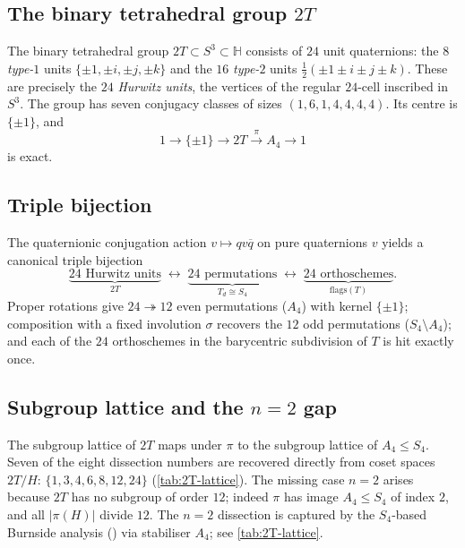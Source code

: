 \documentclass[11pt,a4paper]{article}
\theoremstyle{plain}
\theoremstyle{definition}
\theoremstyle{remark}
\newcommand{\Td}{T_{\!d}}
\newcommand{\HH}{\mathbb{H}}
\begin{document}
\subsection{The binary tetrahedral group \texorpdfstring{$2T$}{2T}}

The binary tetrahedral group $2T \subset S^{3} \subset \HH$ consists of $24$
unit quaternions: the $8$ \emph{type-$1$} units $\{\pm 1, \pm i, \pm j, \pm k\}$
and the $16$ \emph{type-$2$} units $\tfrac{1}{2}(\pm 1 \pm i \pm j \pm k)$.
These are precisely the $24$ \emph{Hurwitz units}, the vertices of the
regular $24$-cell inscribed in $S^{3}$.  The group has seven conjugacy
classes of sizes $(1,6,1,4,4,4,4)$.  Its centre is $\{\pm 1\}$, and
\begin{equation}\label{eq:2T-ses}
  1 \longrightarrow \{\pm 1\} \longrightarrow 2T \xrightarrow{\;\pi\;}
  A_{4} \longrightarrow 1
\end{equation}
is exact.

\subsection{Triple bijection}

The quaternionic conjugation action $v \mapsto q v \overline{q}$ on pure
quaternions $v$ yields a canonical triple bijection
\begin{equation}\label{eq:triple-bij}
  \underbrace{24 \text{ Hurwitz units}}_{2T}
  \;\longleftrightarrow\;
  \underbrace{24 \text{ permutations}}_{\Td \cong S_{4}}
  \;\longleftrightarrow\;
  \underbrace{24 \text{ orthoschemes}}_{\text{flags}(T)}.
\end{equation}
Proper rotations give $24 \twoheadrightarrow 12$ even permutations ($A_{4}$)
with kernel $\{\pm 1\}$; composition with a fixed involution $\sigma$
recovers the $12$ odd permutations ($S_{4} \setminus A_{4}$); and each of the
$24$ orthoschemes in the barycentric subdivision of $T$ is hit exactly once.

\subsection{Subgroup lattice and the \texorpdfstring{$n = 2$}{n = 2} gap}

The subgroup lattice of $2T$ maps under $\pi$ to the subgroup lattice of
$A_{4} \leq S_{4}$.  Seven of the eight dissection numbers are recovered
directly from coset spaces $2T/H$: $\{1,3,4,6,8,12,24\}$
(\cref{tab:2T-lattice}).  The missing case $n = 2$ arises because $2T$ has
no subgroup of order $12$; indeed $\pi$ has image $A_{4} \leq S_{4}$ of
index $2$, and all $|\pi(H)|$ divide $12$.  The $n = 2$ dissection is
captured by the $S_{4}$-based Burnside analysis () via
stabiliser $A_{4}$; see \cref{tab:2T-lattice}.
\end{document}
